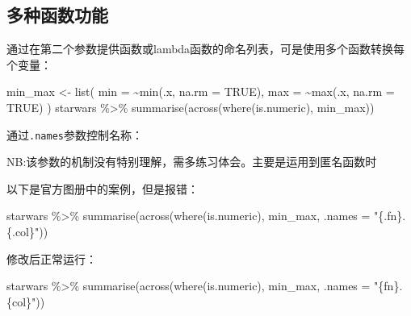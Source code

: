 \documentclass[
]{book}
\newenvironment{Shaded}{\begin{snugshade}}{\end{snugshade}}
\newcommand{\AttributeTok}[1]{\textcolor[rgb]{0.77,0.63,0.00}{#1}}
\newcommand{\ConstantTok}[1]{\textcolor[rgb]{0.00,0.00,0.00}{#1}}
\newcommand{\FunctionTok}[1]{\textcolor[rgb]{0.00,0.00,0.00}{#1}}
\newcommand{\NormalTok}[1]{#1}
\newcommand{\OtherTok}[1]{\textcolor[rgb]{0.56,0.35,0.01}{#1}}
\newcommand{\SpecialCharTok}[1]{\textcolor[rgb]{0.00,0.00,0.00}{#1}}
\newcommand{\StringTok}[1]{\textcolor[rgb]{0.31,0.60,0.02}{#1}}
\begin{document}
\hypertarget{ux591aux79cdux51fdux6570ux529fux80fd}{%
\subsection{多种函数功能}\label{ux591aux79cdux51fdux6570ux529fux80fd}}

通过在第二个参数提供函数或lambda函数的命名列表，可是使用多个函数转换每个变量：

\begin{Shaded}
\begin{Highlighting}[]
\NormalTok{min\_max }\OtherTok{\textless{}{-}} \FunctionTok{list}\NormalTok{(}
  \AttributeTok{min =} \SpecialCharTok{\textasciitilde{}}\FunctionTok{min}\NormalTok{(.x, }\AttributeTok{na.rm =} \ConstantTok{TRUE}\NormalTok{), }
  \AttributeTok{max =} \SpecialCharTok{\textasciitilde{}}\FunctionTok{max}\NormalTok{(.x, }\AttributeTok{na.rm =} \ConstantTok{TRUE}\NormalTok{)}
\NormalTok{)}
\NormalTok{starwars }\SpecialCharTok{\%\textgreater{}\%} \FunctionTok{summarise}\NormalTok{(}\FunctionTok{across}\NormalTok{(}\FunctionTok{where}\NormalTok{(is.numeric), min\_max))}
\end{Highlighting}
\end{Shaded}

通过\texttt{.names}参数控制名称：

NB:该参数的机制没有特别理解，需多练习体会。主要是运用到匿名函数时

以下是官方图册中的案例，但是报错：

\begin{Shaded}
\begin{Highlighting}[]
\NormalTok{starwars }\SpecialCharTok{\%\textgreater{}\%} \FunctionTok{summarise}\NormalTok{(}\FunctionTok{across}\NormalTok{(}\FunctionTok{where}\NormalTok{(is.numeric), min\_max, }\AttributeTok{.names =} \StringTok{"\{.fn\}.\{.col\}"}\NormalTok{))}
\end{Highlighting}
\end{Shaded}

修改后正常运行：

\begin{Shaded}
\begin{Highlighting}[]
\NormalTok{starwars }\SpecialCharTok{\%\textgreater{}\%} \FunctionTok{summarise}\NormalTok{(}\FunctionTok{across}\NormalTok{(}\FunctionTok{where}\NormalTok{(is.numeric), min\_max, }\AttributeTok{.names =} \StringTok{"\{fn\}.\{col\}"}\NormalTok{))}
\end{Highlighting}
\end{Shaded}
\end{document}
